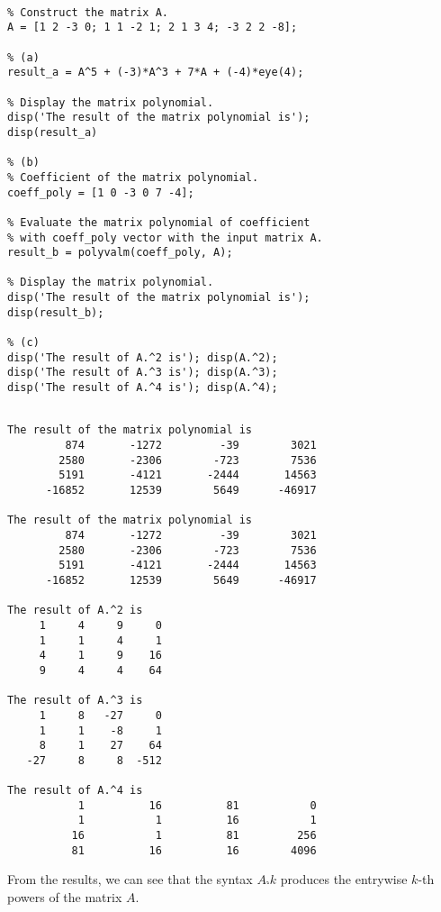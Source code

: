 \begin{sol}

\begin{verbatim}

% Construct the matrix A.
A = [1 2 -3 0; 1 1 -2 1; 2 1 3 4; -3 2 2 -8]; 

% (a)
result_a = A^5 + (-3)*A^3 + 7*A + (-4)*eye(4);

% Display the matrix polynomial.
disp('The result of the matrix polynomial is');
disp(result_a) 

% (b)
% Coefficient of the matrix polynomial.
coeff_poly = [1 0 -3 0 7 -4]; 

% Evaluate the matrix polynomial of coefficient
% with coeff_poly vector with the input matrix A.
result_b = polyvalm(coeff_poly, A);

% Display the matrix polynomial.
disp('The result of the matrix polynomial is');
disp(result_b);

% (c)
disp('The result of A.^2 is'); disp(A.^2);
disp('The result of A.^3 is'); disp(A.^3);
disp('The result of A.^4 is'); disp(A.^4);
\end{verbatim}

\begin{outputs}

\begin{verbatim}

The result of the matrix polynomial is
         874       -1272         -39        3021
        2580       -2306        -723        7536
        5191       -4121       -2444       14563
      -16852       12539        5649      -46917

The result of the matrix polynomial is
         874       -1272         -39        3021
        2580       -2306        -723        7536
        5191       -4121       -2444       14563
      -16852       12539        5649      -46917

The result of A.^2 is
     1     4     9     0
     1     1     4     1
     4     1     9    16
     9     4     4    64

The result of A.^3 is
     1     8   -27     0
     1     1    -8     1
     8     1    27    64
   -27     8     8  -512

The result of A.^4 is
           1          16          81           0
           1           1          16           1
          16           1          81         256
          81          16          16        4096
\end{verbatim}
\end{outputs}

\noindent From the results, we can see that the syntax $A.$\hspace{1mm}$\hat{}$\hspace{1mm}$k$ produces the entrywise $k$-th powers of the matrix $A$.

\end{sol}



